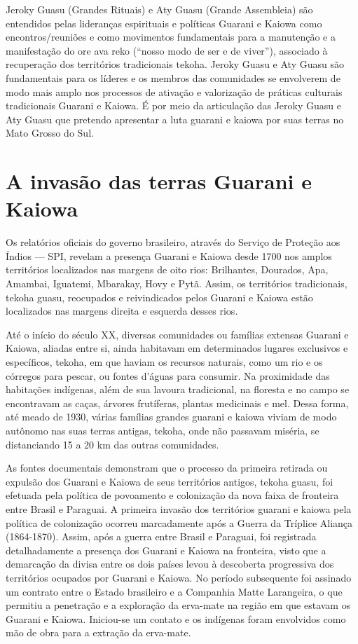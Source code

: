 Jeroky Guasu (Grandes Rituais) e Aty Guasu (Grande Assembleia) são
entendidos pelas lideranças espirituais e políticas Guarani e Kaiowa
como encontros/reuniões e como movimentos fundamentais para a
manutenção e a manifestação do ore ava reko (``nosso modo de ser e de
viver''), associado à recuperação dos territórios tradicionais tekoha.
Jeroky Guasu e Aty Guasu são fundamentais para os líderes e os membros
das comunidades se envolverem de modo mais amplo nos processos de
ativação e valorização de práticas culturais tradicionais Guarani e
Kaiowa. É por meio da articulação das Jeroky Guasu e Aty Guasu que
pretendo apresentar a luta guarani e kaiowa por suas terras no Mato
Grosso do Sul. 

\section{A invasão das terras Guarani e Kaiowa}

Os relatórios oficiais do governo brasileiro, através do Serviço de
Proteção aos Índios — SPI, revelam a presença Guarani e Kaiowa desde
1700 nos amplos territórios localizados nas margens de oito rios:
Brilhantes, Dourados, Apa, Amambai, Iguatemi, Mbarakay, Hovy e Pytã.
Assim, os territórios tradicionais, tekoha guasu, reocupados e
reivindicados pelos Guarani e Kaiowa estão localizados nas margens
direita e esquerda desses rios.

Até o início do século XX, diversas comunidades ou famílias extensas
Guarani e Kaiowa, aliadas entre si, ainda habitavam em determinados
lugares exclusivos e específicos, tekoha, em que haviam os recursos
naturais, como um rio e os córregos para pescar, ou fontes d’águas para
consumir. Na proximidade das habitações indígenas, além de sua lavoura
tradicional, na floresta e no campo se encontravam as caças, árvores
frutíferas, plantas medicinais e mel. Dessa forma, até meado de 1930,
várias famílias grandes guarani e kaiowa viviam de modo autônomo nas
suas terras antigas, tekoha, onde não passavam miséria, se distanciando
15 a 20 km das outras comunidades.

As fontes documentais demonstram que o processo da primeira retirada ou
expulsão dos Guarani e Kaiowa de seus territórios antigos, tekoha
guasu, foi efetuada pela política de povoamento e colonização da nova
faixa de fronteira entre Brasil e Paraguai. A primeira invasão dos
territórios guarani e kaiowa pela política de colonização ocorreu
marcadamente após a Guerra da Tríplice Aliança (1864-1870). Assim, após
a guerra entre Brasil e Paraguai, foi registrada detalhadamente a
presença dos Guarani e Kaiowa na fronteira, visto que a demarcação da
divisa entre os dois países levou à descoberta progressiva dos
territórios ocupados por Guarani e Kaiowa. No período subsequente foi
assinado um contrato entre o Estado brasileiro e a Companhia Matte
Larangeira, o que permitiu a penetração e a exploração da erva-mate na
região em que estavam os Guarani e Kaiowa. Iniciou-se um contato e os
indígenas foram envolvidos como mão de obra para a extração da
erva-mate.


